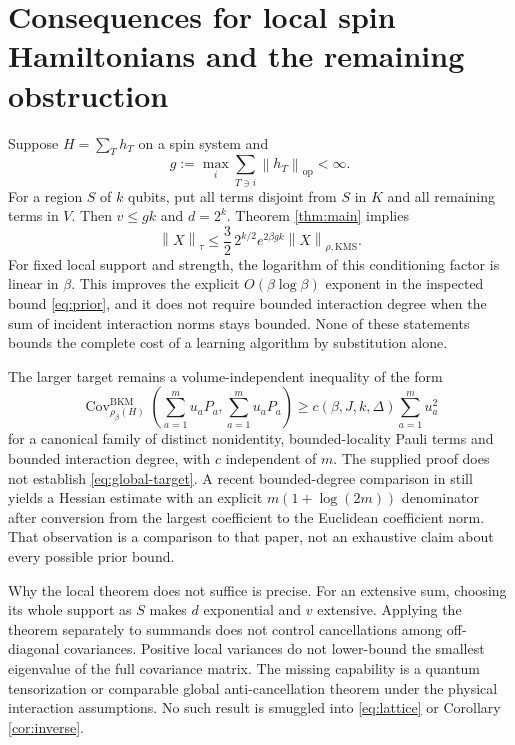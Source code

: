 \documentclass[11pt]{article}
\theoremstyle{remark}\newtheorem{remark}[theorem]{Remark}
\newcommand{\op}{\mathrm{op}}
\newcommand{\KMS}{\mathrm{KMS}}
\newcommand{\BKM}{\mathrm{BKM}}
\newcommand{\norm}[1]{\left\lVert #1\right\rVert}
\begin{document}
\section{Consequences for local spin Hamiltonians and the remaining obstruction}
Suppose $H=\sum_T h_T$ on a spin system and
\[
 g:=\max_i\sum_{T\ni i}\norm{h_T}_\op<\infty.
\]
For a region $S$ of $k$ qubits, put all terms disjoint from $S$ in $K$ and all remaining terms in $V$. Then $v\leq gk$ and $d=2^k$. Theorem \ref{thm:main} implies
\begin{equation}\label{eq:lattice}
 \boxed{\norm X_{\tau}\leq\frac32\,2^{k/2}e^{2\beta gk}\norm X_{\rho,\KMS}.}
\end{equation}
For fixed local support and strength, the logarithm of this conditioning factor is linear in $\beta$. This improves the explicit $O(\beta\log\beta)$ exponent in the inspected bound \eqref{eq:prior}, and it does not require bounded interaction degree when the sum of incident interaction norms stays bounded. None of these statements bounds the complete cost of a learning algorithm by substitution alone.

The larger target remains a volume-independent inequality of the form
\begin{equation}\label{eq:global-target}
 \operatorname{Cov}^{\BKM}_{\rho_\beta(H)}\left(\sum_{a=1}^m u_aP_a,
 \sum_{a=1}^m u_aP_a\right)
 \geq c(\beta,J,k,\Delta)\sum_{a=1}^m u_a^2
\end{equation}
for a canonical family of distinct nonidentity, bounded-locality Pauli terms and bounded interaction degree, with $c$ independent of $m$. The supplied proof does not establish \eqref{eq:global-target}. A recent bounded-degree comparison in \cite[Appendix D]{SYK} still yields a Hessian estimate with an explicit $m(1+\log(2m))$ denominator after conversion from the largest coefficient to the Euclidean coefficient norm. That observation is a comparison to that paper, not an exhaustive claim about every possible prior bound.

Why the local theorem does not suffice is precise. For an extensive sum, choosing its whole support as $S$ makes $d$ exponential and $v$ extensive. Applying the theorem separately to summands does not control cancellations among off-diagonal covariances. Positive local variances do not lower-bound the smallest eigenvalue of the full covariance matrix. The missing capability is a quantum tensorization or comparable global anti-cancellation theorem under the physical interaction assumptions. No such result is smuggled into \eqref{eq:lattice} or Corollary \ref{cor:inverse}.
\end{document}

